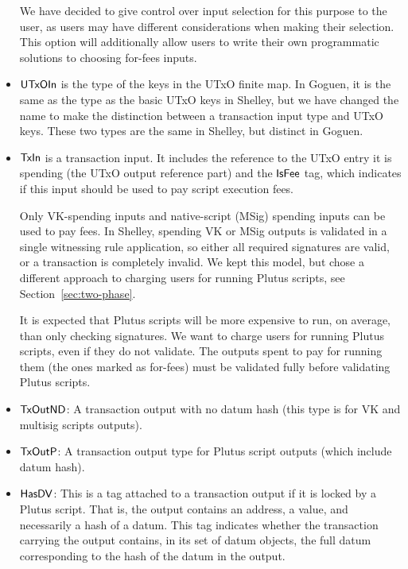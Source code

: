 \begin{itemize}
  We have decided to give control over input selection for this purpose to the user,
  as users may have different considerations when making their selection. This
  option will additionally allow users to write their own programmatic solutions
  to choosing for-fees inputs.

  \item $\mathsf{UTxOIn}$ is the type of the keys in the UTxO finite map. In Goguen, it is
  the same as the type as the basic UTxO keys in Shelley, but we have changed the name
  to make the distinction between a transaction input type and UTxO keys.
  These two types are the same in Shelley, but distinct in Goguen.

  \item $\mathsf{TxIn}$ is a transaction input. It includes the reference to the UTxO entry it is spending
  (the UTxO output reference part) and the $\mathsf{IsFee}$ tag, which indicates if this input should
  be used to pay script execution fees.

  Only VK-spending inputs and native-script (MSig)
  spending inputs can be used to
  pay fees. In Shelley, spending VK or MSig outputs is validated in a single witnessing
    rule application, so either all required signatures are valid, or a transaction
    is completely invalid. We kept this model, but chose a different approach to charging
    users for running Plutus scripts, see Section~\ref{sec:two-phase}.

    It is expected that Plutus scripts will be more
    expensive to run, on average, than only checking signatures. We want to
    charge users for running Plutus scripts, even if they do not validate. The
    outputs spent to pay for running them (the ones marked as for-fees) must
    be validated fully before validating Plutus scripts.

  \item $\mathsf{TxOutND}$: A transaction output with no datum hash
  (this type is for VK and multisig scripts outputs).

  \item $\mathsf{TxOutP}$: A transaction output type for Plutus
  script outputs (which include datum hash).

  \item $\mathsf{HasDV}$:
  This is a tag attached to a transaction output if it is locked by a Plutus
  script. That is, the output contains an address, a value, and necessarily a
  hash of a datum.
  This tag indicates whether the transaction carrying the output
  contains, in its set of datum objects, the full datum corresponding
  to the hash of the datum in the output.


\end{itemize}
